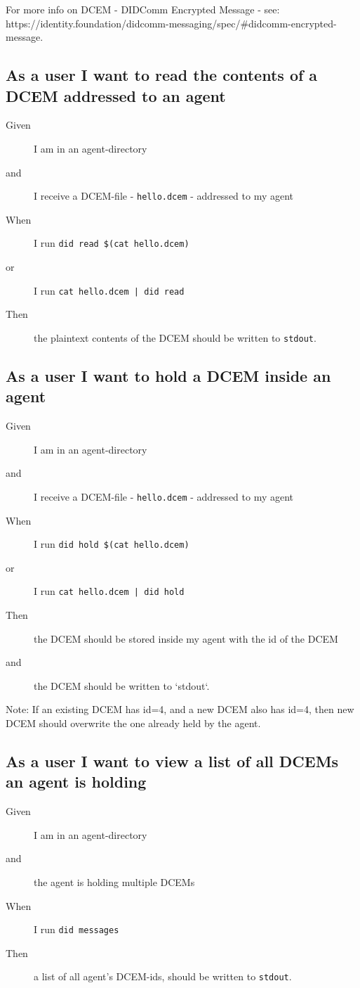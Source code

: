 For more info on DCEM - DIDComm Encrypted Message - see: https://identity.foundation/didcomm-messaging/spec/\#didcomm-encrypted-message.



\subsection{As a user I want to read the contents of a DCEM addressed to an agent}
\begin{description}
    \item[Given] I am in an agent-directory
    \item[and] I receive a DCEM-file - \texttt{hello.dcem} - addressed to my agent
    \item[When] I run \texttt{did read \$(cat hello.dcem)} 
    \item[or] I run \texttt{cat hello.dcem | did read}
    \item[Then] the plaintext contents of the DCEM should be written to \texttt{stdout}.
\end{description}



\subsection{As a user I want to hold a DCEM inside an agent}
\begin{description}
    \item[Given] I am in an agent-directory
    \item[and] I receive a DCEM-file - \texttt{hello.dcem} - addressed to my agent
    \item[When] I run \texttt{did hold \$(cat hello.dcem)} 
    \item[or] I run \texttt{cat hello.dcem | did hold}
    \item[Then] the DCEM should be stored inside my agent with the id of the DCEM
    \item[and] the DCEM should be written to `stdout`.
\end{description}

Note: If an existing DCEM has id=4, and a new DCEM also has id=4, then new DCEM should overwrite the one already held by the agent.



\subsection{As a user I want to view a list of all DCEMs an agent is holding}
\begin{description}
    \item[Given] I am in an agent-directory
    \item[and] the agent is holding multiple DCEMs
    \item[When] I run \texttt{did messages}
    \item[Then] a list of all agent's DCEM-ids, should be written to \texttt{stdout}.
\end{description}



